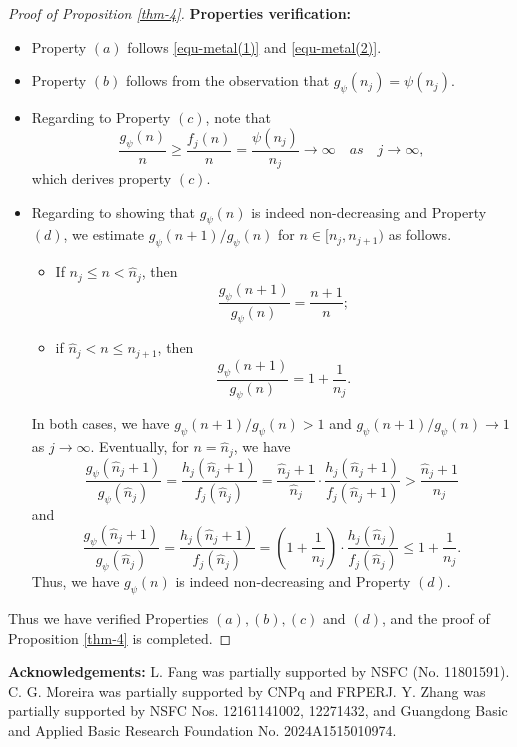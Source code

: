 \documentclass[12pt,reqno]{amsart}
\renewcommand{\=}{\coloneqq}
\theoremstyle{plain}
\begin{document}
\begin{proof}[Proof of Proposition \ref{thm-4}]
\textbf{Properties verification:}
\begin{itemize}
\item Property $(a)$ follows \eqref{equ-metal(1)} and \eqref{equ-metal(2)}.
\item Property $(b)$ follows from the observation that $g_\psi(n_j) = \psi(n_j)$.
\item Regarding to Property $(c)$, note that
\begin{equation}
\frac{g_\psi(n)}{n} \geq \frac{f_j(n)}{n} = \frac{\psi(n_j)}{n_j} \to \infty \quad as \quad j\to \infty,
\end{equation}
which derives property $(c)$.
\item Regarding to showing that $g_\psi(n)$ is indeed non-decreasing and Property $(d)$, we estimate $g_\psi(n+1)/g_\psi(n)$ for $n\in [n_j, n_{j+1})$ as follows.
\begin{itemize}
\item If $n_j\leq n<\hat{n}_j$, then
\begin{equation*}
\frac{g_\psi(n+1)}{g_\psi(n)} = \frac{n+1}{n};
\end{equation*}
\item if $\hat{n}_j<n\leq n_{j+1}$, then
\begin{equation*}
\frac{g_\psi(n+1)}{g_\psi(n)} = 1+\frac{1}{n_j}.
\end{equation*}
\end{itemize}
In both cases, we have $g_\psi(n+1)/g_\psi(n)>1$ and $g_\psi(n+1)/g_\psi(n)\to 1$ as $j\to\infty$. Eventually, for $n=\hat{n}_j$, we have
\begin{equation*}
\frac{g_\psi(\hat{n}_j+1)}{g_\psi(\hat{n}_j)} = \frac{h_j(\hat{n}_j+1)}{f_j(\hat{n}_j)} = \frac{\hat{n}_j + 1}{\hat{n}_j} \cdot \frac{h_j(\hat{n}_j+1)}{f_j(\hat{n}_j+1)} > \frac{\hat{n}_j + 1}{\hat{n}_j}
\end{equation*}
and
\begin{equation*}
\frac{g_\psi(\hat{n}_j+1)}{g_\psi(\hat{n}_j)} = \frac{h_j(\hat{n}_j+1)}{f_j(\hat{n}_j)} = \left(1+\frac{1}{n_j}\right) \cdot \frac{h_j(\hat{n}_j)}{f_j(\hat{n}_j)} \leq 1+\frac{1}{n_j}.
\end{equation*}
Thus, we have $g_\psi(n)$ is indeed non-decreasing and Property $(d)$.
\end{itemize}
Thus we have verified Properties $(a),(b),(c)$ and $(d)$, and the proof of Proposition \ref{thm-4} is completed.
\end{proof}


{\bf Acknowledgements:}
L. Fang was partially supported by NSFC (No. 11801591). C. G. Moreira was partially supported by CNPq and FRPERJ. Y. Zhang was partially supported by NSFC Nos. 12161141002, 12271432, and Guangdong Basic and Applied Basic Research Foundation No. 2024A1515010974.
\end{document}
